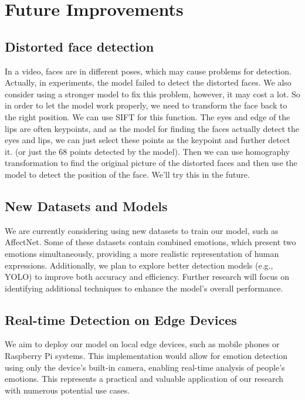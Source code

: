 \section{Future Improvements}
\subsection{Distorted face detection}
In a video, faces are in different poses, which may cause problems for detection. Actually, in experiments, the model failed to detect the distorted faces. We also consider using a stronger model to fix this problem, however, it may cost a lot. 
So in order to let the model work properly, we need to transform the face back to the right position. We can use SIFT for this function. The eyes and edge of the lips are often keypoints, and as the model for finding the faces actually detect the eyes and lips, we can just select these points as the keypoint and further detect it. (or just the 68 points detected by the model).
Then we can use homography transformation to find the original picture of the distorted faces and then use the model to detect the position of the face. We'll try this in the future.

\subsection{New Datasets and Models}
We are currently considering using new datasets to train our model, such as AffectNet. Some of these datasets contain combined emotions, which present two emotions simultaneously, providing a more realistic representation of human expressions. Additionally, we plan to explore better detection models (e.g., YOLO) to improve both accuracy and efficiency. Further research will focus on identifying additional techniques to enhance the model's overall performance.

\subsection{Real-time Detection on Edge Devices}
We aim to deploy our model on local edge devices, such as mobile phones or Raspberry Pi systems. This implementation would allow for emotion detection using only the device's built-in camera, enabling real-time analysis of people's emotions. This represents a practical and valuable application of our research with numerous potential use cases.
